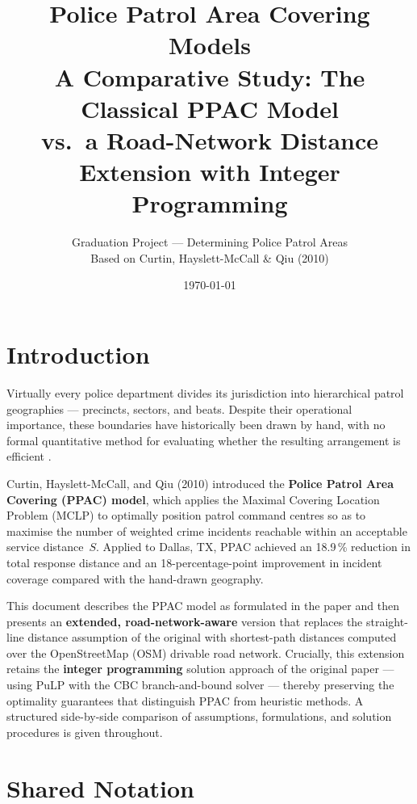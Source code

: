 \documentclass[12pt]{article}
\title{\textbf{Police Patrol Area Covering Models}\\[0.4em]
       \large A Comparative Study: The Classical PPAC Model\\
       vs.\ a Road-Network Distance Extension with Integer Programming}
\author{Graduation Project --- Determining Police Patrol Areas\\
        Based on Curtin, Hayslett-McCall \& Qiu (2010)}
\date{\today}
\begin{document}
\maketitle
\tableofcontents
\newpage

\section{Introduction}

Virtually every police department divides its jurisdiction into hierarchical
patrol geographies --- precincts, sectors, and beats.  Despite their operational
importance, these boundaries have historically been drawn by hand, with no
formal quantitative method for evaluating whether the resulting arrangement
is efficient \cite{curtin2010}.

Curtin, Hayslett-McCall, and Qiu (2010) introduced the \textbf{Police Patrol
Area Covering (PPAC) model}, which applies the Maximal Covering Location
Problem (MCLP) \cite{church1974} to optimally position patrol command centres
so as to maximise the number of weighted crime incidents reachable within an
acceptable service distance~$S$.  Applied to Dallas, TX, PPAC achieved an
18.9\,\% reduction in total response distance and an 18-percentage-point
improvement in incident coverage compared with the hand-drawn geography.

This document describes the PPAC model as formulated in the paper and then
presents an \textbf{extended, road-network-aware} version that replaces the
straight-line distance assumption of the original with shortest-path distances
computed over the OpenStreetMap (OSM) drivable road network.  Crucially, this
extension retains the \textbf{integer programming} solution approach of the
original paper --- using PuLP with the CBC branch-and-bound solver --- thereby
preserving the optimality guarantees that distinguish PPAC from heuristic
methods.  A structured side-by-side comparison of assumptions, formulations,
and solution procedures is given throughout.

\section{Shared Notation}
\end{document}
